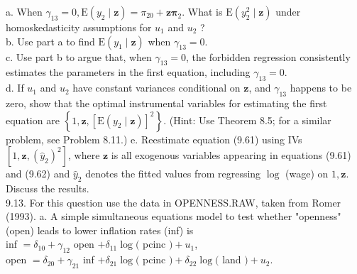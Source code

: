 \documentclass[10pt]{article}
\begin{document}
a. When $\gamma_{13}=0, \mathrm{E}\left(y_{2} \mid \mathbf{z}\right)=\pi_{20}+\mathbf{z} \boldsymbol{\pi}_{2}$. What is $\mathrm{E}\left(y_{2}^{2} \mid \mathbf{z}\right)$ under homoskedasticity assumptions for $u_{1}$ and $u_{2}$ ?\\
b. Use part a to find $\mathrm{E}\left(y_{1} \mid \mathbf{z}\right)$ when $\gamma_{13}=0$.\\
c. Use part b to argue that, when $\gamma_{13}=0$, the forbidden regression consistently estimates the parameters in the first equation, including $\gamma_{13}=0$.\\
d. If $u_{1}$ and $u_{2}$ have constant variances conditional on $\mathbf{z}$, and $\gamma_{13}$ happens to be zero, show that the optimal instrumental variables for estimating the first equation are $\left\{1, \mathbf{z},\left[\mathrm{E}\left(y_{2} \mid \mathbf{z}\right)\right]^{2}\right\}$. (Hint: Use Theorem 8.5; for a similar problem, see Problem 8.11.) e. Reestimate equation (9.61) using IVs $\left[1, \mathbf{z},\left(\hat{y}_{2}\right)^{2}\right]$, where $\mathbf{z}$ is all exogenous variables appearing in equations (9.61) and (9.62) and $\hat{y}_{2}$ denotes the fitted values from regressing $\log$ (wage) on $1, \mathbf{z}$. Discuss the results.\\
9.13. For this question use the data in OPENNESS.RAW, taken from Romer (1993). a. A simple simultaneous equations model to test whether "openness" (open) leads to lower inflation rates (inf) is\\
inf $=\delta_{10}+\gamma_{12}$ open $+\delta_{11} \log ($ pcinc $)+u_{1}$,\\
open $=\delta_{20}+\gamma_{21}$ inf $+\delta_{21} \log ($ pcinc $)+\delta_{22} \log ($ land $)+u_{2}$.
\end{document}
